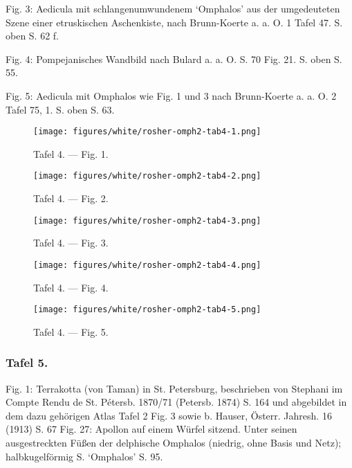 \documentclass[a4paper, 11pt, oneside]{article}
\begin{document}
Fig. 3: Aedicula mit schlangenumwundenem `Omphalos' aus der umgedeuteten Szene einer etruskischen Aschenkiste, nach Brunn-Koerte a. a. O. 1 Tafel 47. S. oben S. 62 f.

Fig. 4: Pompejanisches Wandbild nach Bulard a. a. O. S. 70 Fig. 21. S. oben S. 55.

Fig. 5: Aedicula mit Omphalos wie Fig. 1 und 3 nach Brunn-Koerte a. a. O. 2 Tafel 75, 1. S. oben S. 63.
\clearpage
\vspace*{\fill}
\begin{figure}[H]
\centering
\texttt{[image: figures/white/rosher-omph2-tab4-1.png]}
\caption{Tafel 4. --- Fig. 1.}
\end{figure}
\vspace*{\fill}
\clearpage
\vspace*{\fill}
\begin{figure}[H]
\centering
\texttt{[image: figures/white/rosher-omph2-tab4-2.png]}
\caption{Tafel 4. --- Fig. 2.}
\end{figure}
\vspace*{\fill}
\clearpage
\vspace*{\fill}
\begin{figure}[H]
\centering
\texttt{[image: figures/white/rosher-omph2-tab4-3.png]}
\caption{Tafel 4. --- Fig. 3.}
\end{figure}
\vspace*{\fill}
\clearpage
\vspace*{\fill}
\begin{figure}[H]
\centering
\texttt{[image: figures/white/rosher-omph2-tab4-4.png]}
\caption{Tafel 4. --- Fig. 4.}
\end{figure}
\vspace*{\fill}
\clearpage
\vspace*{\fill}
\begin{figure}[H]
\centering
\texttt{[image: figures/white/rosher-omph2-tab4-5.png]}
\caption{Tafel 4. --- Fig. 5.}
\end{figure}
\vspace*{\fill}
\clearpage
\subsubsection{Tafel 5.}

Fig. 1: Terrakotta (von Taman) in St. Petersburg, beschrieben von Stephani im Compte Rendu de St. Pétersb. 1870/71 (Petersb. 1874) S. 164 und abgebildet in dem dazu gehörigen Atlas Tafel 2 Fig. 3 sowie b. Hauser, Österr. Jahresh. 16 (1913) S. 67 Fig. 27: Apollon auf einem Würfel sitzend. Unter seinen ausgestreckten Füßen der delphische Omphalos (niedrig, ohne Basis und Netz); halbkugelförmig S. `Omphalos' S. 95.
\end{document}
